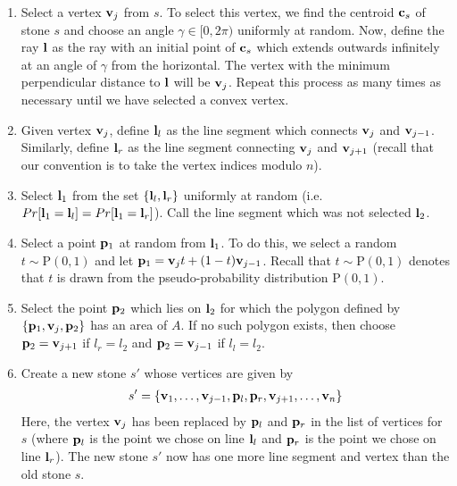 \begin{enumerate}
  \item Select a vertex $\mathbf{v}_j$ from $s$. To select this vertex, we find the centroid $\mathbf{c}_s$ of stone $s$ and choose an angle $\gamma \in [0, 2\pi)$ uniformly at random. Now, define the ray $\mathbf{l}$ as the ray with an initial point of $\mathbf{c}_s$ which extends outwards infinitely at an angle of $\gamma$ from the horizontal. The vertex with the minimum perpendicular distance to $\mathbf{l}$ will be $\mathbf{v}_j$. Repeat this process as many times as necessary until we have selected a convex vertex.
  \item Given vertex $\mathbf{v}_j$, define $\mathbf{l}_l$ as the line segment which connects $\mathbf{v}_j$ and $\mathbf{v}_{{j-1}}$. Similarly, define $\mathbf{l}_r$ as the line segment connecting $\mathbf{v}_j$ and $\mathbf{v}_{{j+1}}$ (recall that our convention is to take the vertex indices modulo $n$).
  \item Select $\mathbf{l}_1$ from the set $\{ \mathbf{l}_l, \mathbf{l}_r \}$ uniformly at random (i.e. $Pr[\mathbf{l}_1 = \mathbf{l}_l] = Pr[\mathbf{l}_1 = \mathbf{l}_r]$). Call the line segment which was not selected $\mathbf{l}_2$.
  \item Select a point $\mathbf{p}_1$ at random from $\mathbf{l}_1$. To do this, we select a random $t \sim \mathrm{P}(0,1)$ and let $\mathbf{p}_1 = \mathbf{v}_j t + (1-t) \mathbf{v}_{{j-1}}$. Recall that $t \sim \mathrm{P}(0,1)$ denotes that $t$ is drawn from the pseudo-probability distribution $\mathrm{P}(0,1)$.
  \item Select the point $\mathbf{p}_2$ which lies on $\mathbf{l}_2$ for which the polygon defined by $\{\mathbf{p}_1, \mathbf{v}_j, \mathbf{p}_2\}$ has an area of $A$. If no such polygon exists, then choose $\mathbf{p}_2 = \mathbf{v}_{{j+1}}$ if $l_r = l_2$ and $\mathbf{p}_2 = \mathbf{v}_{{j-1}}$ if $l_l = l_2$.
  \item Create a new stone $s'$ whose vertices are given by
    \begin{eqnarray*}
      s' = \{ \mathbf{v}_1, \ldots, \mathbf{v}_{j-1}, \mathbf{p}_l, \mathbf{p}_r, \mathbf{v}_{j+1}, \ldots, \mathbf{v}_n \}
    \end{eqnarray*}
    Here, the vertex $\mathbf{v}_j$ has been replaced by $\mathbf{p}_l$ and $\mathbf{p}_r$ in the list of vertices for $s$ (where $\mathbf{p}_l$ is the point we chose on line $\mathbf{l}_l$ and $\mathbf{p}_r$ is the point we chose on line $\mathbf{l}_r$). The new stone $s'$ now has one more line segment and vertex than the old stone $s$.
\end{enumerate}

